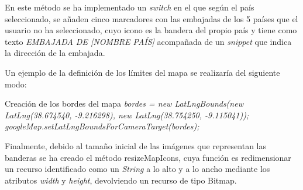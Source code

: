 \documentclass[letterpaper,twocolumn,openany,nodeprecatedcode,dvipsnames,nomultitoc]{dndbook}
\begin{document}
\begin{justify}
\vspace{5pt}
\par
En este método se ha implementado un \textit{switch} en el que según el país seleccionado, se añaden cinco marcadores con las embajadas de los 5 países que el usuario no ha seleccionado, cuyo icono es la bandera del propio país y tiene como texto \textit{EMBAJADA DE [NOMBRE PAÍS]} acompañada de un \textit{snippet} que indica la dirección de la embajada. 

\vspace{5pt}
\par
Un ejemplo de la definición de los límites del mapa se realizaría del siguiente modo:
\DndSetThemeColor[PhbMauve]
\begin{DndSidebar}{Creación de los bordes del mapa}
  \textit{bordes = new LatLngBounds(new LatLng(38.674540, -9.216298), new LatLng(38.754250, -9.115041)); 
  googleMap.setLatLngBoundsForCameraTarget(bordes);}
\end{DndSidebar}

\vspace{5pt}

\par 
Finalmente, debido al tamaño inicial de las imágenes que representan las banderas se ha creado el método \textcolor{BurntOrange}{resizeMapIcons}, cuya función es redimensionar un recurso identificado como un \textit{String} a lo alto y a lo ancho mediante los atributos \textit{width} y \textit{height}, devolviendo un recurso de tipo Bitmap. 
\end{justify}
\end{document}
